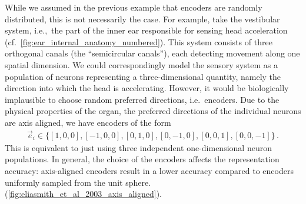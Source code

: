 \documentclass[10pt,letterpaper,oneside]{article}
\begin{document}
While we assumed in the previous example that encoders are randomly distributed, this is not necessarily the case. For example, take the vestibular system, i.e.,~the part of the inner ear responsible for sensing head acceleration (cf.~\cref{fig:ear_internal_anatomy_numbered}). This system consists of three orthogonal canals (the \enquote{semicircular canals}), each detecting movement along one spatial dimension.  We could correspondingly model the sensory system as a population of neurons representing a three-dimensional quantity, namely the direction into which the head is accelerating. However, it would be biologically implausible to choose random preferred directions, i.e.~encoders. Due to the physical properties of the organ, the preferred directions of the individual neurons are axis aligned, we have encoders of the form
\begin{align*}
	\vec e_i \in \big\{ [1, 0, 0], [-1, 0, 0], [0, 1, 0], [0, -1, 0], [0, 0, 1], [0, 0, -1] \big\} \,.
\end{align*}
This is equivalent to just using three independent one-dimensional neuron populations. In general, the choice of the encoders affects the representation accuracy: axis-aligned encoders result in a lower accuracy compared to encoders uniformly sampled from the unit sphere. (\cref{fig:eliasmith_et_al_2003_axis_aligned}).


\printbibliography
\end{document}
